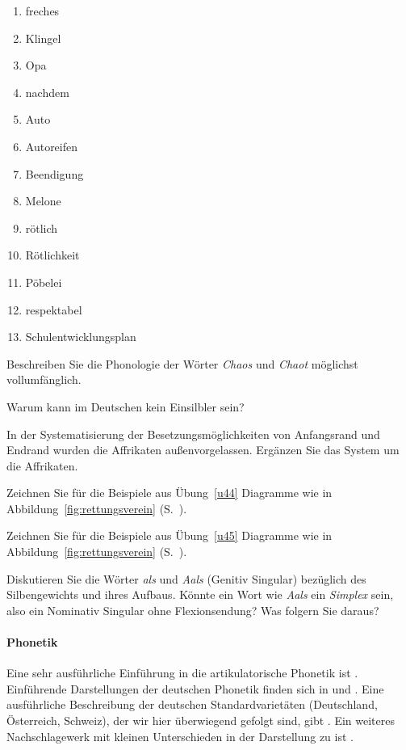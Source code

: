 \begin{enumerate}\Lf
  \item freches
  \item Klingel
  \item Opa
  \item nachdem
  \item Auto
  \item Autoreifen
  \item Beendigung
  \item Melone
  \item rötlich
  \item Rötlichkeit
  \item Pöbelei
  \item respektabel
  \item Schulentwicklungsplan
\end{enumerate}

\Uebung[\tristar] \label{u46} Beschreiben Sie die Phonologie der Wörter \textit{Chaos} und \textit{Chaot} möglichst vollumfänglich.

\Uebung \label{u47} Warum kann \textipa{[s5]} im Deutschen kein Einsilbler sein?

\Uebung[\tristar] \label{u48} In der Systematisierung der Besetzungsmöglichkeiten von Anfangsrand und Endrand wurden die Affrikaten außenvorgelassen.
Ergänzen Sie das System um die Affrikaten.

\Uebung[\tristar] \label{u49} Zeichnen Sie für die Beispiele aus Übung~\ref{u44} Diagramme wie in Abbildung~\ref{fig:rettungsverein} (S.~\pageref{fig:rettungsverein}).

\Uebung[\tristar] \label{u410} Zeichnen Sie für die Beispiele aus Übung~\ref{u45} Diagramme wie in Abbildung~\ref{fig:rettungsverein} (S.~\pageref{fig:rettungsverein}).

\Uebung[\tristar] \label{u411} Diskutieren Sie die Wörter \textit{als} und \textit{Aals} (Genitiv Singular) bezüglich des Silbengewichts und ihres Aufbaus.
Könnte ein Wort wie \textit{Aals} ein \textit{Simplex} sein, also \zB ein Nominativ Singular ohne Flexionsendung?
Was folgern Sie daraus?

\WeitereLiteratur

\paragraph*{Phonetik}

Eine sehr ausführliche Einführung in die artikulatorische Phonetik ist \citet{Laver94}.
Einführende Darstellungen der deutschen Phonetik finden sich \zB in \citet{RRKWS09} und \citet{Wiese10}.
Eine ausführliche Beschreibung der deutschen Standardvarietäten (Deutschland, Österreich, Schweiz), der wir hier überwiegend gefolgt sind, gibt \citet{Krech-ea2009}.
Ein weiteres Nachschlagewerk mit kleinen Unterschieden in der Darstellung zu \citealp{Krech-ea2009} ist \citet{Mangold06}.

